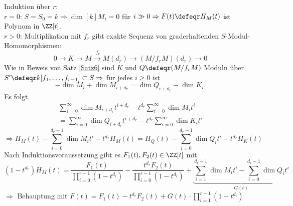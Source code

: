 \begin{Bew}
  Induktion über $r$:\\
  $r=0$: $S = S_0 = k \Rightarrow \dim[k]{M_i} = 0$ für $i \gg 0
  \Rightarrow F(t) \defeqr H_M(t)$ ist Polynom in $\ZZ[t]$.\\
  $r>0$: Multiplikation mit $f_r$ gibt exakte Sequenz von graderhaltenden
  $S$-Modul-Homomorphismen:
  $$ 0 \to K \to M \overset{\cdot f_r}{\to} M(d_r) \to (M/f_r M)(d_r) \to 0$$
  Wie in Beweis von Satz \ref{Satz6} sind $K$ und $Q \defeqr (M/f_r M)$ Moduln
  über $S' \defeqr k[f_1, \dots, f_{r-1}] \subset S \Rightarrow$ für jedes $i
  \ge 0$ ist
  \[
   -\dim{M_i} + \dim{M_{i + d_r}} = \dim{Q_{i+d_r}}-
  \dim{K_i}.
  \]
  Es folgt
  \begin{equation*}
  \begin{split}
  \sum_{i=0}^{\infty} \dim{M_{i+d_r}}t^{i+d_r} - t^{d_r}\sum_{i=0}^{\infty}
  \dim{M_i}t^i \\
   = \sum_{i=0}^{\infty} \dim{Q_{i+d_r}}t^{i+d_r} - t^{d_r}\sum_{i=0}^{\infty} \dim{K_i}t^i
  \end{split}
  \end{equation*}
  \[
  \Rightarrow H_M(t) - \sum_{i=0}^{d_r -1} \dim{M_i}t^i - t^{d_r} H_M(t)
  = H_Q(t) - \sum_{i=0}^{d_r - 1} \dim{Q_i}t^i - t^{d_r} H_K(t)
  \]
  Nach Induktionsvoraussetzung gibt es $F_1(t), F_2(t) \in \ZZ[t]$ mit
  \[
  (1-t^{d_r})H_M(t)= \frac{F_1(t)}{\displaystyle\prod_{i=0}^{r-1}(1-t^{d_i})}-
  \frac{t^{d_r} F_2(t)}{\displaystyle \prod_{i=0}^{r-1}(1-t^{d_i})} +
  \underset{G(t)}{\underbrace{\sum_{i=1}^{d_r-1} \dim{M_i}t^i -
  \sum_{i=0}^{d_r - 1} \dim{Q_i}t^i}}
  \]
  $\Rightarrow$ Behauptung mit $F(t) = F_1(t) - t^{d_r}F_2(t) + G(t)\cdot \displaystyle\prod_{i=1}^{r-1}(1-t^{d_i})$
\end{Bew}
